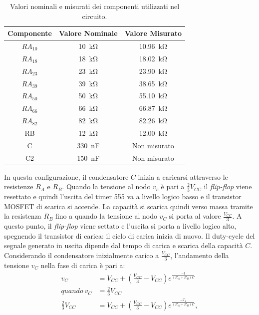 \def\arraystretch{1.3}
\begin{table}[h!]
	\centering
	\begin{tabular}{|c|c|c|}
		\hline
		Componente	& Valore Nominale & Valore Misurato \\ \hline
		$RA_{10}$ &\SI{10}{\kilo\ohm} & \SI{10.96}{\kilo\ohm} \\ \hline
		$RA_{18}$ &\SI{18}{\kilo\ohm} & \SI{18.02}{\kilo\ohm} \\ \hline
		$RA_{23}$ &\SI{23}{\kilo\ohm} & \SI{23.90}{\kilo\ohm} \\ \hline
		$RA_{39}$ &\SI{39}{\kilo\ohm} & \SI{38.65}{\kilo\ohm} \\ \hline
		$RA_{50}$ &\SI{50}{\kilo\ohm} & \SI{55.10}{\kilo\ohm} \\ \hline
		$RA_{66}$ &\SI{66}{\kilo\ohm} & \SI{66.87}{\kilo\ohm} \\ \hline
		$RA_{82}$ &\SI{82}{\kilo\ohm} & \SI{82.26}{\kilo\ohm} \\ \hline
		RB &\SI{12}{\kilo\ohm} & \SI{12.00}{\kilo\ohm} \\ \hline
		C & \SI{330}{\nano\farad} & Non misurato \\ \hline
		C2 & \SI{150}{\nano\farad} & Non misurato \\ \hline
	\end{tabular}
	\caption{Valori nominali e misurati dei componenti utilizzati nel circuito.}
	\label{tab:valori_componenti_2}
\end{table}
In questa configurazione, il condensatore $C$ inizia a caricarsi attraverso le resistenze $R_A$ e $R_B$. Quando la tensione al nodo $v_c$ è pari a $\frac{2}{3}V_{CC}$ il \textit{flip-flop} viene resettato e quindi l'uscita del timer 555 va a livello logico basso e il transistor MOSFET di scarica si accende. La capacità si scarica quindi verso massa tramite la resistenza $R_B$ fino a quando la tensione al nodo $v_C$ si porta al valore $\frac{V_{CC}}{3}$. A questo punto, il \textit{flip-flop} viene settato e l'uscita si porta a livello logico alto, spegnendo il transistor di carica: il ciclo di carica inizia di nuovo. Il duty-cycle del segnale generato in uscita dipende dal tempo di carica e scarica della capacità $C$. Considerando il condensatore inizialmente carico a $\frac{V_{CC}}{3}$, l'andamento della tensione $v_C$ nella fase di carica è pari a:
\begin{equation}
	\begin{split}
		v_C&=V_{CC}+(\frac{V_{CC}}{3}-V_{CC})e^{\frac{-t}{(R_A+R_B)C}} \\
		quando\  v_C&=\frac{2}{3}V_{CC} \\
		\frac{2}{3}V_{CC}&=V_{CC}+(\frac{V_{CC}}{3}-V_{CC})e^{\frac{-T_1}{(R_A+R_B)C}}, \\
	\end{split}
\end{equation}
